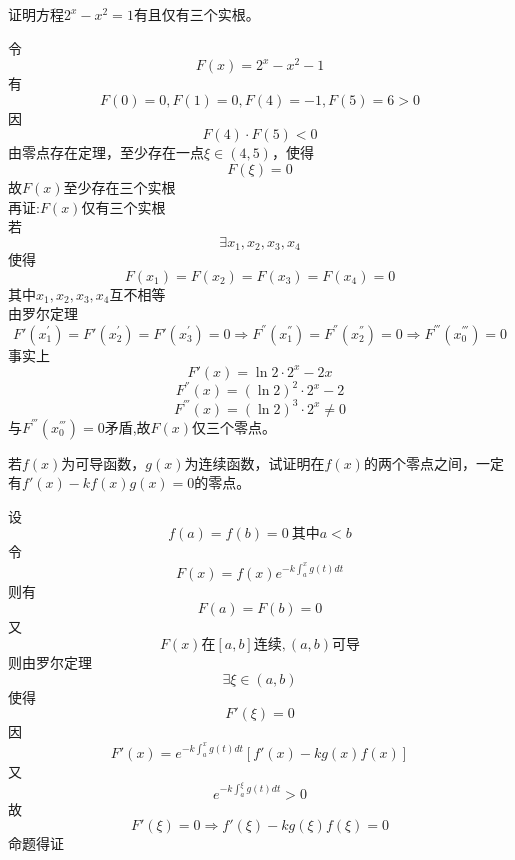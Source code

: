 \begin{example}
	证明方程$2^x-x^2=1$有且仅有三个实根。
\end{example}
	\begin{newproof}
		令\[F\left( x \right) =2^x-x^2-1\]
		有\[F\left( 0 \right) =0,F\left( 1 \right) =0,F\left( 4 \right) =-1,F\left( 5 \right) =6>0\]
		因\[F\left( 4 \right) \cdot F\left( 5 \right) <0\]
		由零点存在定理，至少存在一点$\xi \in \left( 4,5 \right) $，使得\[F\left( \xi \right) =0\]
		故$F\left( x \right) \text{至少存在三}个\text{实根}$\\
		再证:$F\left( x \right) $仅有三个实根\\
		若\[\exists x_1,x_2,x_3,x_4\]
		使得\[F\left( x_1 \right) =F\left( x_2 \right) =F\left( x_3 \right) =F\left( x_4 \right) =0\]
		其中$x_1,x_2,x_3,x_4$互不相等\\
		由罗尔定理\[F'\left( x_{1}^{'} \right) =F'\left( x_{2}^{'} \right) =F'\left( x_{3}^{'} \right) =0 \Rightarrow F^{''}\left( x_{1}^{''} \right) =F^{''}\left( x_{2}^{''} \right) =0\Rightarrow F^{'''}\left( x_{0}^{'''} \right) =0\]
		事实上\[F'\left( x \right) =\ln 2\cdot 2^x-2x\]
		\[F^{''}\left( x \right) =\left( \ln 2 \right) ^2\cdot 2^x-2\]
		\[F^{'''}\left( x \right) =\left( \ln 2 \right) ^3\cdot 2^x\ne 0\]
		与$F^{'''}\left( x_{0}^{'''} \right) =0$矛盾,故$F(x)$仅三个零点。
	\end{newproof}

\begin{example}
	若$f(x)$为可导函数，$g(x)$为连续函数，试证明在$f(x)$的两个零点之间，一定有$f'(x)-kf(x)g(x)=0$的零点。
\end{example}
	\begin{newproof}
		设\[f\left( a \right) =f\left( b \right) =0\ \text{其中}a<b\]
		令\[F\left( x \right) =f\left( x \right) e^{-k\int_a^x{g\left( t \right) dt}}\]
		则有\[F\left( a \right) =F\left( b \right) =0\]
		又\[F\left( x \right) \text{在}\left[ a,b \right] \text{连续},\left( a,b \right) \text{可导}\]
		则由罗尔定理\[\exists \xi \in \left( a,b \right) \]
		使得\[F'\left( \xi \right) =0\]
		因\[F'\left( x \right) =e^{-k\int_a^x{g\left( t \right) dt}}\left[ f'\left( x \right) -kg\left( x \right) f\left( x \right) \right] \]
		又\[e^{-k\int_a^{\xi}{g\left( t \right) dt}}>0\]
		故\[F'\left( \xi \right) =0\Rightarrow f'\left( \xi \right) -kg\left( \xi \right) f\left( \xi \right) =0\]
		命题得证
	\end{newproof}

